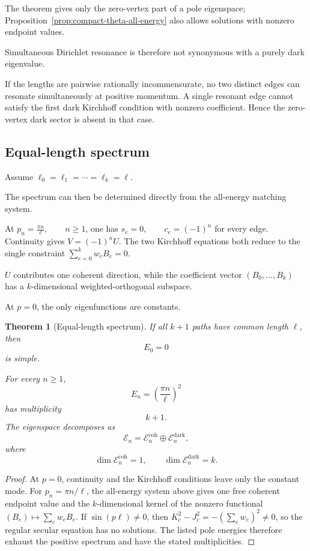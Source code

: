 \documentclass[11pt]{article}
\theoremstyle{plain}
\newtheorem{theorem}{Theorem}[section]
\theoremstyle{definition}
\begin{document}
The theorem gives only the zero-vertex part of a pole eigenspace; Proposition~\ref{prop:compact-theta-all-energy} also allows solutions with nonzero endpoint values.

Simultaneous Dirichlet resonance is therefore not synonymous with a purely dark eigenvalue.

If the lengths are pairwise rationally incommensurate, no two distinct
edges can resonate simultaneously at positive momentum. A single resonant
edge cannot satisfy the first dark Kirchhoff condition with nonzero
coefficient. Hence the zero-vertex dark sector is absent in that case.

\subsection{Equal-length spectrum}
\label{subsec:compact-theta-equal}

Assume
\(\ell_0 = \ell_1 = \cdots = \ell_k = \ell\).

The spectrum can then be determined directly from the all-energy matching
system.

At
\(p_n=\frac{\pi n}{\ell}, \qquad n\geq1\),
one has \(s_e=0, \qquad c_e=(-1)^n\) for every edge. Continuity gives
\(V=(-1)^nU\).
The two Kirchhoff equations both reduce to the single constraint
\(\sum_{e=0}^{k}w_eB_e=0\).

\(U\) contributes one coherent direction, while the coefficient vector \((B_0,\ldots,B_k)\) has a \(k\)-dimensional weighted-orthogonal subspace.

At \(p=0\), the only eigenfunctions are constants.

\begin{theorem}[Equal-length spectrum]
\label{thm:compact-theta-equal-spectrum}
If all \(k+1\) paths have common length \(\ell\), then
\[
  E_0=0
\]
is simple.

For every \(n\geq1\),
\[
  E_n
  =
  \left(
    \frac{\pi n}{\ell}
  \right)^2
\]
has multiplicity
\[
  k+1.
\]
The eigenspace decomposes as
\[
  \mathcal E_n
  =
  \mathcal E_n^{\mathrm{coh}}
  \oplus
  \mathcal E_n^{\mathrm{dark}},
\]
where
\[
  \dim\mathcal E_n^{\mathrm{coh}}=1,
  \qquad
  \dim\mathcal E_n^{\mathrm{dark}}=k.
\]
\end{theorem}

\begin{proof}
At \(p=0\), continuity and the Kirchhoff conditions leave only the constant
mode. For \(p_n=\pi n/\ell\), the all-energy system above gives one free
coherent endpoint value and the \(k\)-dimensional kernel of the nonzero
functional \((B_e)\mapsto\sum_e w_eB_e\). If
\(\sin(p\ell)\neq0\), then
\(K_c^2-J_c^2=-(\sum_e w_e)^2\neq0\), so the regular secular equation has no
solutions. The listed pole energies therefore exhaust the positive spectrum
and have the stated multiplicities.
\end{proof}
\end{document}
